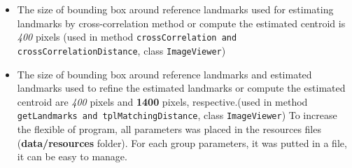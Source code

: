 \begin{itemize}
\begin{itemize}
	\end{itemize}
\item The size of bounding box around reference landmarks used for estimating landmarks by cross-correlation method or compute the estimated centroid is \textit{400} pixels (used in method \texttt{crossCorrelation and crossCorrelationDistance}, class \texttt{ImageViewer})
\item The size of bounding box around reference landmarks and estimated landmarks used to refine the estimated landmarks or compute the estimated centroid are \textit{400} pixels and \textbf{1400} pixels, respective.(used in method \texttt{getLandmarks and tplMatchingDistance}, class \texttt{ImageViewer})
To increase the flexible of program, all parameters was placed in the resources files (\textbf{data/resources} folder). For each group parameters, it was putted in a file, it can be easy to manage.
\end{itemize}
